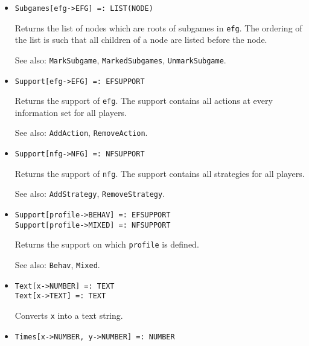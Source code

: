 \begin{itemize}
\item{}
\protect \large \begin{verbatim}
Subgames[efg->EFG] =: LIST(NODE) 
\end{verbatim}\normalsize

\bd
Returns the list of nodes which are roots of subgames in \verb+efg+.
The ordering of the list is such that
all children of a node are listed before the node.
\item [See also:] \verb+MarkSubgame+, \verb+MarkedSubgames+, 
\verb+UnmarkSubgame+.
\ed

\item{}
\protect \large \begin{verbatim}
Support[efg->EFG] =: EFSUPPORT 
\end{verbatim}\normalsize

\bd
Returns the support of \verb+efg+.  The support contains all actions at every
information set for all players.
\item [See also:] \verb+AddAction+, \verb+RemoveAction+.
\ed

\item{}
\protect \large \begin{verbatim}
Support[nfg->NFG] =: NFSUPPORT 
\end{verbatim}\normalsize

\bd
Returns the support of \verb+nfg+.  The support contains all strategies
for all players.
\item [See also:] \verb+AddStrategy+, \verb+RemoveStrategy+.
\ed

\item{}
\protect \large \begin{verbatim}
Support[profile->BEHAV] =: EFSUPPORT 
Support[profile->MIXED] =: NFSUPPORT 
\end{verbatim}\normalsize

\bd
Returns the support on which \verb+profile+ is defined.
\item [See also:] \verb+Behav+, \verb+Mixed+.
\ed


\item{}
\protect \large \begin{verbatim}
Text[x->NUMBER] =: TEXT 
Text[x->TEXT] =: TEXT 
\end{verbatim} \normalsize

\bd
Converts \verb+x+ into a text string.
\ed

\item{} 
\protect \large \begin{verbatim}
Times[x->NUMBER, y->NUMBER] =: NUMBER 
\end{verbatim} \normalsize


\end{itemize}
